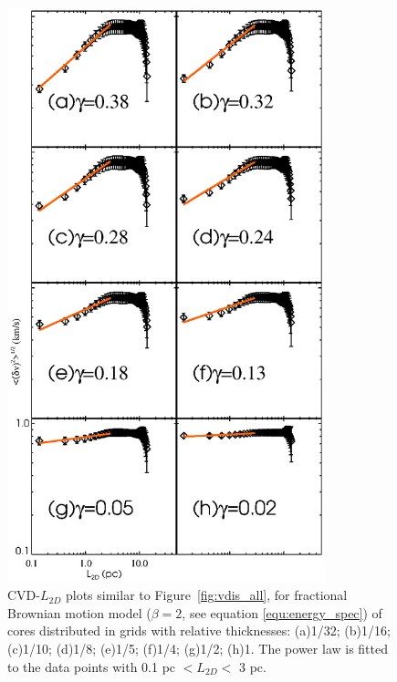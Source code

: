 \documentclass[iop,revtex4]{emulateapj}
\begin{document}
\begin{figure}[htbp]
\begin{minipage}[b]{0.45\textwidth}
  \includegraphics[width=9.2cm]{vdisfft_errorbar2_all.eps}
\end{minipage}
\caption{ CVD-$L_{2D}$ plots similar to Figure~\ref{fig:vdis_all}, for fractional Brownian motion model ($\beta=2$, see equation \ref{equ:energy_spec}) of cores distributed in grids with relative thicknesses: (a)1/32; (b)1/16; (c)1/10; (d)1/8; (e)1/5; (f)1/4; (g)1/2; (h)1. The power law is fitted to the data points with 0.1 pc $<L_{2D}<$ 3 pc. }\label{fig:vdis_fft_errorbar}
\end{figure}
\end{document}
